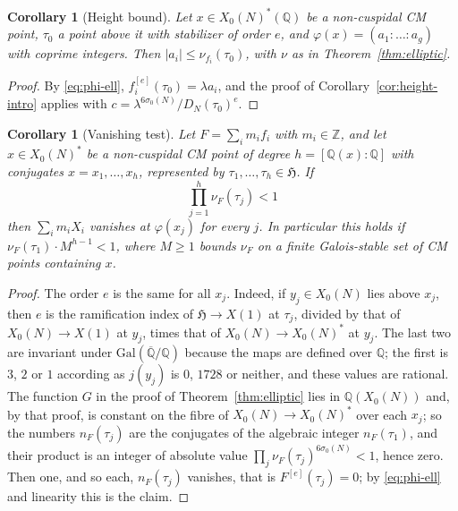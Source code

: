 \documentclass[11pt]{amsart}
\newtheorem{corollary}[theorem]{Corollary}
\theoremstyle{definition}
\theoremstyle{remark}
\newcommand{\Z}{\mathbb{Z}}
\newcommand{\Q}{\mathbb{Q}}
\newcommand{\HH}{\mathfrak{H}}
\newcommand{\Qbar}{\overline{\Q}}
\newcommand{\sz}{\sigma_0}
\newcommand{\Xs}{X_0(N)^*}
\begin{document}
\begin{corollary}[Height bound]\label{cor:height}
Let $x\in\Xs(\Q)$ be a non-cuspidal CM point, $\tau_0$ a point above it with
stabilizer of order $e$, and $\varphi(x)=(a_1:\dots:a_g)$ with coprime integers.
Then $\lvert a_i\rvert\le\nu_{f_i}(\tau_0)$, with $\nu$ as in
Theorem~\ref{thm:elliptic}.
\end{corollary}
\begin{proof}
By \eqref{eq:phi-ell}, $f_i^{[e]}(\tau_0)=\lambda a_i$, and the proof of
Corollary~\ref{cor:height-intro} applies with
$c=\lambda^{6\sz(N)}/D_N(\tau_0)^e$.
\end{proof}

\begin{corollary}[Vanishing test]\label{cor:vanish}
Let $F=\sum_im_if_i$ with $m_i\in\Z$, and let $x\in\Xs$ be a non-cuspidal CM
point of degree $h=[\Q(x):\Q]$ with conjugates $x=x_1,\dots,x_h$, represented by
$\tau_1,\dots,\tau_h\in\HH$.  If
\[
\prod_{j=1}^h\nu_F(\tau_j)<1
\]
then $\sum_im_iX_i$ vanishes at $\varphi(x_j)$ for every $j$.  In particular this
holds if $\nu_F(\tau_1)\cdot M^{h-1}<1$, where $M\ge1$ bounds $\nu_F$ on a finite
Galois-stable set of CM points containing $x$.
\end{corollary}
\begin{proof}
The order $e$ is the same for all $x_j$.  Indeed, if $y_j\in X_0(N)$ lies above
$x_j$, then $e$ is the ramification index of $\HH\to X(1)$ at $\tau_j$, divided
by that of $X_0(N)\to X(1)$ at $y_j$, times that of $X_0(N)\to\Xs$ at $y_j$.  The
last two are invariant under $\mathrm{Gal}(\Qbar/\Q)$ because the maps are defined
over $\Q$; the first is $3$, $2$ or $1$ according as $j(y_j)$ is $0$, $1728$ or
neither, and these values are rational.  The function $G$ in the proof of Theorem~\ref{thm:elliptic} lies in
$\Q(X_0(N))$ and, by that proof, is constant on the fibre of $X_0(N)\to\Xs$ over
each $x_j$; so the numbers
$n_F(\tau_j)$ are the conjugates of the algebraic integer $n_F(\tau_1)$, and their
product is an integer of absolute value $\prod_j\nu_F(\tau_j)^{6\sz(N)}<1$, hence
zero.  Then one, and so each, $n_F(\tau_j)$ vanishes, that is
$F^{[e]}(\tau_j)=0$; by \eqref{eq:phi-ell} and linearity this is the claim.
\end{proof}
\end{document}
